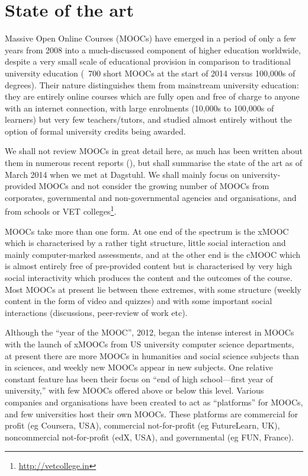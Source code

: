 \section{State of the art}

Massive Open Online Courses (MOOCs) have emerged in a period of only a
few years from 2008 into a much-discussed component of higher education
worldwide, despite a very small scale of educational provision in
comparison to traditional university education (~700 short MOOCs at the
start of 2014 versus 100,000s of degrees).  Their nature distinguishes
them from mainstream university education: they are entirely online
courses which are fully open and free of charge to anyone with an
internet connection, with large enrolments (10,000s to 100,000s of
learners) but very few teachers/tutors, and studied almost entirely
without the option of formal university credits being awarded.

We shall not review MOOCs in great detail here, as much has been written
about them in numerous recent reports (), but shall summarise the state of
the art as of March 2014 when we met at Dagstuhl.
We shall mainly focus on university-provided MOOCs and not consider
the growing number of MOOCs from corporates, governmental and
non-governmental agencies and organisations, and from schools or VET
colleges\footnote{\url{http://vetcollege.in}}.


MOOCs take more than one form.  At one end of the spectrum is the xMOOC
which is characterised by a rather tight structure, little social
interaction and mainly computer-marked assessments, and at the other end
is the cMOOC which is almost entirely free of pre-provided content but
is characterised by very high social interactivity which produces the
content and the outcomes of the course.  Most MOOCs at present lie
between these extremes, with some structure (weekly content in the form
of video and quizzes) and with some important social interactions
(discussions, peer-review of work etc).

Although the ``year of the MOOC'', 2012, began the intense interest in
MOOCs with the launch of xMOOCs from US university computer science
departments, at present there are more MOOCs in humanities and social
science subjects than in sciences, and weekly new MOOCs appear in new
subjects.  One relative constant feature has been their focus on ``end of
high school---first year of university,'' with few MOOCs offered above or
below this level.  Various companies and organisations have been created
to act as   ``platforms'' for MOOCs, and few universities host their own
MOOCs. These platforms are commercial for profit (eg Coursera, USA),
commercial not-for-profit (eg FutureLearn, UK), noncommercial
not-for-profit (edX, USA), and governmental (eg FUN, France).


